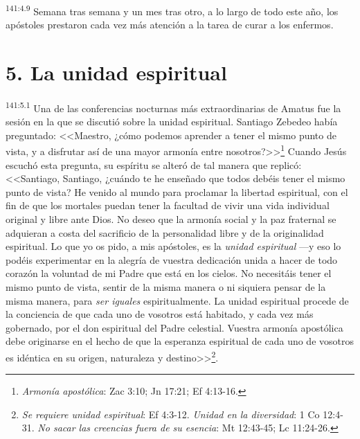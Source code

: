\par 
\textsuperscript{141:4.9} Semana tras semana y un mes tras otro, a lo largo de todo este año, los apóstoles prestaron cada vez más atención a la tarea de curar a los enfermos.

\section*{5. La unidad espiritual}
\par 
\textsuperscript{141:5.1} Una de las conferencias nocturnas más extraordinarias de Amatus fue la sesión en la que se discutió sobre la unidad espiritual. Santiago Zebedeo había preguntado: <<Maestro, ¿cómo podemos aprender a tener el mismo punto de vista, y a disfrutar así de una mayor armonía entre nosotros?>>\footnote{\textit{Armonía apostólica}: Zac 3:10; Jn 17:21; Ef 4:13-16.} Cuando Jesús escuchó esta pregunta, su espíritu se alteró de tal manera que replicó: <<Santiago, Santiago, ¿cuándo te he enseñado que todos debéis tener el mismo punto de vista? He venido al mundo para proclamar la libertad espiritual, con el fin de que los mortales puedan tener la facultad de vivir una vida individual original y libre ante Dios. No deseo que la armonía social y la paz fraternal se adquieran a costa del sacrificio de la personalidad libre y de la originalidad espiritual. Lo que yo os pido, a mis apóstoles, es la \textit{unidad espiritual} ---y eso lo podéis experimentar en la alegría de vuestra dedicación unida a hacer de todo corazón la voluntad de mi Padre que está en los cielos. No necesitáis tener el mismo punto de vista, sentir de la misma manera o ni siquiera pensar de la misma manera, para \textit{ser iguales} espiritualmente. La unidad espiritual procede de la conciencia de que cada uno de vosotros está habitado, y cada vez más gobernado, por el don espiritual del Padre celestial. Vuestra armonía apostólica debe originarse en el hecho de que la esperanza espiritual de cada uno de vosotros es idéntica en su origen, naturaleza y destino>>\footnote{\textit{Se requiere unidad espiritual}: Ef 4:3-12. \textit{Unidad en la diversidad}: 1 Co 12:4-31. \textit{No sacar las creencias fuera de su esencia}: Mt 12:43-45; Lc 11:24-26.}.

